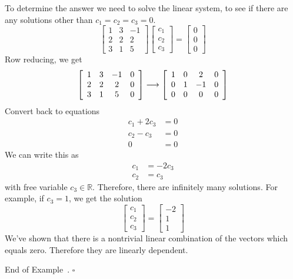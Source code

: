 \documentclass[10pt]{article}
\newenvironment{augmentedmatrix}[1] %
{\left[\begin{array}{#1}}
    {\end{array}\right]}
\theoremstyle{definition}
\newtheorem{example}[theorem]{Example}
\renewenvironment{example}
{\begin{oldexample}}
  {\par\smallskip\hfill   End of Example~\theexample. $\square$    \par\end{oldexample}}
\newcommand{\R}{\mathbb{R}}           %
\begin{document}
\begin{example}
  To determine the answer we need to solve the
  linear system, to see if there are any solutions other than $c_{1}=c_{2}=c_{3}=0$.
  \begin{equation*}
    \begin{bmatrix}
      1&3&-1\\
      2&2&2\\
      3&1&5
    \end{bmatrix}
    \begin{bmatrix}
      c_1\\c_2\\c_3
    \end{bmatrix}
    =
    \begin{bmatrix}
      0\\0\\0
    \end{bmatrix}
  \end{equation*}
  Row reducing, we get
  \begin{equation*}
    \begin{augmentedmatrix}{cccc}
      1&3&-1&0\\
      2&2&2&0\\
      3&1&5&0
    \end{augmentedmatrix}
    \longrightarrow
    \begin{augmentedmatrix}{cccc}
      1&0&2&0\\
      0&1&-1&0\\
      0&0&0&0
    \end{augmentedmatrix}
  \end{equation*}
  Convert back to equations
  \begin{align*}
    c_{1}+2c_{3}&=0\\
    c_{2}-c_{3}&=0\\
    0&=0
  \end{align*}
  We can write this as
  \begin{align*}
    c_{1}&=-2c_{3}\\
    c_{2}&=c_{3}
  \end{align*}
  with free variable $c_{3}\in \R$. Therefore, there are infinitely many
  solutions. For example, if $c_{3}=1$, we get the solution
  \begin{equation*}
    \begin{bmatrix}
      c_{1}\\c_{2}\\c_{3}
    \end{bmatrix}
    =
    \begin{bmatrix}
      -2\\1\\1
    \end{bmatrix}
  \end{equation*}
  We've shown that there is a nontrivial linear combination of the vectors
  which equals zero. Therefore they are linearly dependent.
\end{example}
\end{document}
